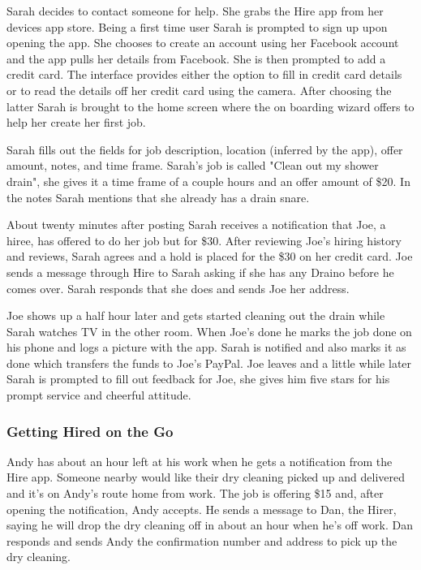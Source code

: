 \documentclass[11pt]{article}
\begin{document}
Sarah decides to contact someone for help. She grabs the Hire app from her devices app store. Being a first time user Sarah is prompted to sign up upon opening the app. She chooses to create an account using her Facebook account and the app pulls her details from Facebook. She is then prompted to add a credit card. The interface provides either the option to fill in credit card details or to read the details off her credit card using the camera. After choosing the latter Sarah is brought to the home screen where the on boarding wizard offers to help her create her first job. 

Sarah fills out the fields for job description, location (inferred by the app), offer amount, notes, and time frame. Sarah's job is called "Clean out my shower drain", she gives it a time frame of a couple hours and an offer amount of \$20. In the notes Sarah mentions that she already has a drain snare.

About twenty minutes after posting Sarah receives a notification that Joe, a hiree, has offered to do her job but for \$30. After reviewing Joe's hiring history and reviews, Sarah agrees and a hold is placed for the \$30 on her credit card. Joe sends a message through Hire to Sarah asking if she has any Draino before he comes over. Sarah responds that she does and sends Joe her address. 

Joe shows up a half hour later and gets started cleaning out the drain while Sarah watches TV in the other room. When Joe's done he marks the job done on his phone and logs a picture with the app. Sarah is notified and also marks it as done which transfers the funds to Joe's PayPal. Joe leaves and a little while later Sarah is prompted to fill out feedback for Joe, she gives him five stars for his prompt service and cheerful attitude.

\subsubsection{Getting Hired on the Go}

Andy has about an hour left at his work when he gets a notification from the Hire app. Someone nearby would like their dry cleaning picked up and delivered and it's on Andy's route home from work. The job is offering \$15 and, after opening the notification, Andy accepts. He sends a message to Dan, the Hirer, saying he will drop the dry cleaning off in about an hour when he's off work. Dan responds and sends Andy the confirmation number and address to pick up the dry cleaning.
\end{document}
